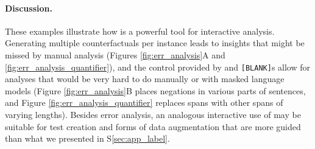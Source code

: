 \paragraph{Discussion.} These examples illustrate how \sysname{} is a powerful tool for interactive analysis.
Generating multiple counterfactuals per instance leads to insights that might be missed by manual analysis (\eg Figures \ref{fig:err_analysis}A and \ref{fig:err_analysis_quantifier}), and the control provided by \tagstrs and \texttt{[BLANK]}s allow for analyses that would be very hard to do manually \cite{wu2019errudite} or with masked language models (\eg Figure \ref{fig:err_analysis}B places negations in various parts of sentences, and Figure \ref{fig:err_analysis_quantifier} replaces spans with other spans of varying lengths). Besides error analysis, an analogous interactive use of \sysname{} may be suitable for test creation \cite{checklist:acl20} and forms of data augmentation that are more guided than what we presented in S\ref{sec:app_label}.





